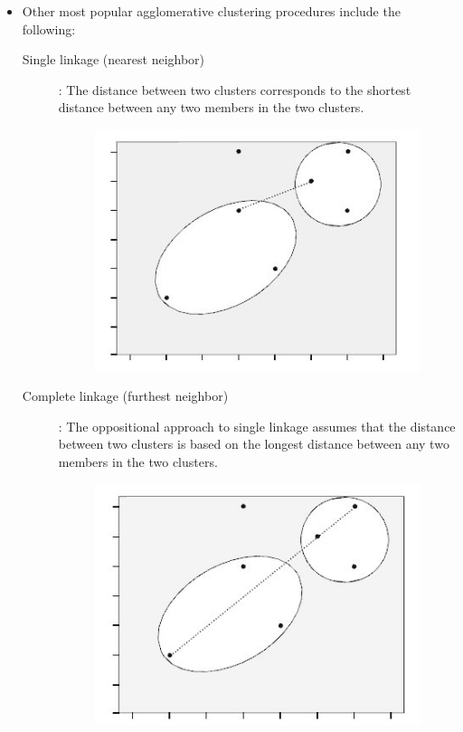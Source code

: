 \documentclass[a4paper,12pt]{article}
\begin{document}
\begin{itemize}
\item Other most popular
agglomerative clustering procedures include the following:
\begin{description}
	\item[Single linkage (nearest neighbor)]: The distance between two clusters corresponds
	to the shortest distance between any two members in the two clusters.
	\begin{figure}[h!]
		\begin{center}
			\includegraphics[scale=0.4]{images/Link1.jpg}\\
		\end{center}
	\end{figure}
	\item[Complete linkage (furthest neighbor)]: The oppositional approach to single
	linkage assumes that the distance between two clusters is based on the longest
	distance between any two members in the two clusters.
	\begin{figure}[h!]
		\begin{center}
			\includegraphics[scale=0.4]{images/Link2.jpg}\\

\end{center}
\end{figure}
\end{description}
\end{itemize}
\end{document}
